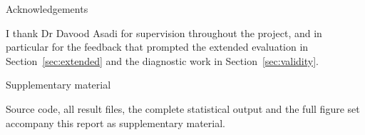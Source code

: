 \documentclass[a4paper, 10pt, conference]{ieeeconf}
\begin{document}
\begin{titlepage}
    \vspace{0.6cm}
    {\large{Acknowledgements}}

    I thank Dr Davood Asadi for supervision throughout the project,
    and in particular for the feedback that prompted the extended
    evaluation in Section~\ref{sec:extended} and the diagnostic work
    in Section~\ref{sec:validity}.

    \vspace{0.6cm}
    {\large{Supplementary material}}

    Source code, all result files, the complete statistical output and
    the full figure set accompany this report as supplementary
    material.

\end{titlepage}

\maketitle
\thispagestyle{empty}
\pagestyle{empty}
\end{document}
